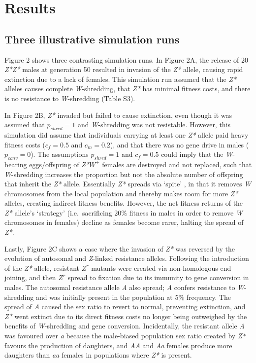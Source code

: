 \documentclass[]{rsos}%
\begin{document}
\hypertarget{results}{%
\section{Results}\label{results}}

\hypertarget{three-illustrative-simulation-runs}{%
\subsection{Three illustrative simulation
runs}\label{three-illustrative-simulation-runs}}

Figure 2 shows three contrasting simulation runs. In Figure 2A, the
release of 20 \emph{Z*Z*} males at generation 50 resulted in invasion of
the \emph{Z*} allele, causing rapid extinction due to a lack of females.
This simulation run assumed that the \emph{Z*} alleles causes complete
\emph{W}-shredding, that \emph{Z*} has minimal fitness costs, and there
is no resistance to \emph{W}-shredding (Table S3).

In Figure 2B, \emph{Z*} invaded but failed to cause extinction, even
though it was assumed that \(p_{shred} = 1\) and \emph{W}-shredding was
not resistable. However, this simulation did assume that individuals
carrying at least one \emph{Z*} allele paid heavy fitness costs
(\(c_f = 0.5\) and \(c_m = 0.2\)), and that there was no gene drive in
males (\(p_{conv} = 0\)). The assumptions \(p_{shred} = 1\) and
\(c_f = 0.5\) could imply that the \emph{W}-bearing eggs/offspring of
\emph{Z*}\(W^+\) females are destroyed and not replaced, such that
\emph{W}-shredding increases the proportion but not the absolute number
of offspring that inherit the \emph{Z*} allele. Essentially \emph{Z*}
spreads via `spite' \citep{gardner2006sp}, in that it removes \emph{W}
chromosomes from the local population and thereby makes room for more
\emph{Z*} alleles, creating indirect fitness benefits. However, the net
fitness returns of the \emph{Z*} allele's `strategy' (i.e.~sacrificing
20\% fitness in males in order to remove \emph{W} chromosomes in
females) decline as females become rarer, halting the spread of
\emph{Z*}.

Lastly, Figure 2C shows a case where the invasion of \emph{Z*} was
reversed by the evolution of autosomal and \emph{Z}-linked resistance
alleles. Following the introduction of the \emph{Z*} allele, resistant
\(Z^r\) mutants were created via non-homologous end joining, and then
\(Z^r\) spread to fixation due to its immunity to gene conversion in
males. The autosomal resistance allele \emph{A} also spread; \emph{A}
confers resistance to \emph{W}-shredding and was initially present in
the population at 5\% frequency. The spread of \emph{A} caused the sex
ratio to revert to normal, preventing extinction, and \emph{Z*} went
extinct due to its direct fitness costs no longer being outweighed by
the benefits of \emph{W}-shredding and gene conversion. Incidentally,
the resistant allele \emph{A} was favoured over \emph{a} because the
male-biased population sex ratio created by \emph{Z*} favours the
production of daughters, and \emph{AA} and \emph{Aa} females produce
more daughters than \emph{aa} females in populations where \emph{Z*} is
present.
\end{document}
